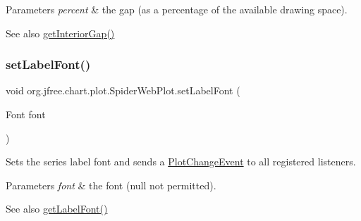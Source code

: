 \begin{DoxyParams}{Parameters}
{\em percent} & the gap (as a percentage of the available drawing space).\\
\hline
\end{DoxyParams}
\begin{DoxySeeAlso}{See also}
\mbox{\hyperlink{classorg_1_1jfree_1_1chart_1_1plot_1_1_spider_web_plot_abad1e3eb2dad1089d41ae206a2a56c3a}{get\+Interior\+Gap()}} 
\end{DoxySeeAlso}
\mbox{\label{classorg_1_1jfree_1_1chart_1_1plot_1_1_spider_web_plot_aba780c8190d9f3467f5ade6e0735fe50}} 
\subsubsection{\texorpdfstring{set\+Label\+Font()}{setLabelFont()}}
{\footnotesize\ttfamily void org.\+jfree.\+chart.\+plot.\+Spider\+Web\+Plot.\+set\+Label\+Font (\begin{DoxyParamCaption}\item[{Font}]{font }\end{DoxyParamCaption})}

Sets the series label font and sends a \mbox{\hyperlink{}{Plot\+Change\+Event}} to all registered listeners.


\begin{DoxyParams}{Parameters}
{\em font} & the font ({\ttfamily null} not permitted).\\
\hline
\end{DoxyParams}
\begin{DoxySeeAlso}{See also}
\mbox{\hyperlink{classorg_1_1jfree_1_1chart_1_1plot_1_1_spider_web_plot_a5993272d93bc89f903ef3f4a0fbc8bc7}{get\+Label\+Font()}} 
\end{DoxySeeAlso}
\mbox{\label{classorg_1_1jfree_1_1chart_1_1plot_1_1_spider_web_plot_a9910d82d876e9229115d36b0bdbc8174}} 
